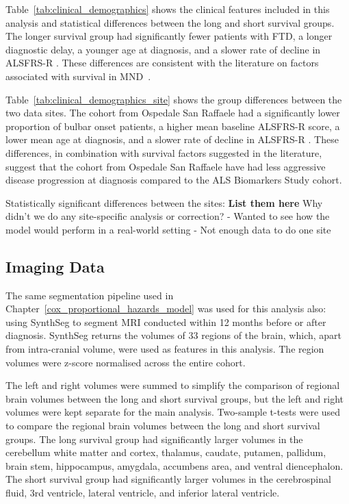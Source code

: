 Table~\ref{tab:clinical_demographics} shows the clinical features included in this analysis and statistical differences between the long and short survival groups.
The longer survival group had significantly fewer patients with FTD, a longer diagnostic delay, a younger age at diagnosis, and a slower rate of decline in ALSFRS-R .
These differences are consistent with the literature on factors associated with survival in MND~\cite{suPredictorsSurvivalPatients2021}.


Table~\ref{tab:clinical_demographics_site} shows the group differences between the two data sites.
The cohort from Ospedale San Raffaele had a significantly lower proportion of bulbar onset patients, a higher mean baseline ALSFRS-R score, a lower mean age at diagnosis, and a slower rate of decline in ALSFRS-R .
These differences, in combination with survival factors suggested in the literature, suggest that the cohort from Ospedale San Raffaele have had less aggressive disease progression at diagnosis compared to the ALS Biomarkers Study cohort.

Statistically significant differences between the sites: \textbf{List them here}
Why didn't we do any site-specific analysis or correction?
- Wanted to see how the model would perform in a real-world setting
- Not enough data to do one site

\subsection{Imaging Data}
The same segmentation pipeline used in Chapter~\ref{cox_proportional_hazards_model} was used for this analysis also: using SynthSeg to segment MRI conducted within 12 months before or after diagnosis.
SynthSeg returns the volumes of 33 regions of the brain, which, apart from intra-cranial volume, were used as features in this analysis.
The region volumes were z-score normalised across the entire cohort.

The left and right volumes were summed to simplify the comparison of regional brain volumes between the long and short survival groups, but the left and right volumes were kept separate for the main analysis.
Two-sample t-tests were used to compare the regional brain volumes between the long and short survival groups.
The long survival group had significantly larger volumes in the cerebellum white matter and cortex, thalamus, caudate, putamen, pallidum, brain stem, hippocampus, amygdala, accumbens area, and ventral diencephalon.
The short survival group had significantly larger volumes in the cerebrospinal fluid, 3rd ventricle, lateral ventricle, and inferior lateral ventricle.


